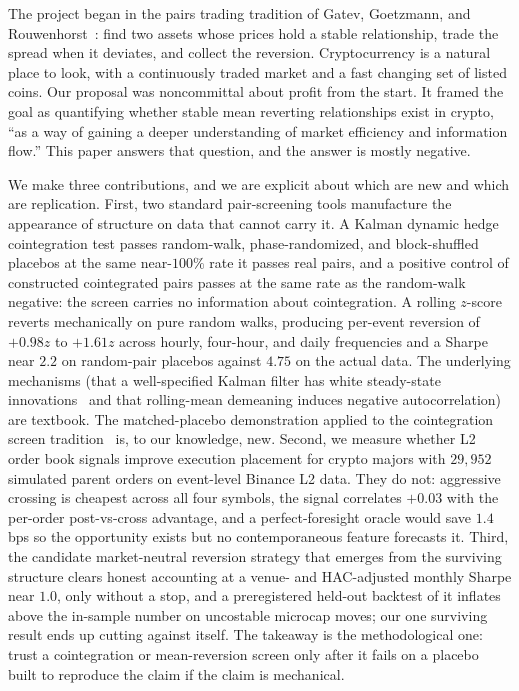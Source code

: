 \documentclass[11pt]{article}
\begin{document}
The project began in the pairs trading tradition of Gatev, Goetzmann, and
Rouwenhorst~\cite{gatev2006pairs}: find two assets whose prices hold a stable relationship, trade the
spread when it deviates, and collect the reversion. Cryptocurrency is a natural place to look,
with a continuously traded market and a fast changing set of listed coins. Our proposal was noncommittal about profit from the start. It framed the goal as quantifying whether stable mean reverting
relationships exist in crypto, ``as a way of gaining a deeper understanding of market efficiency
and information flow.'' This paper answers that question, and the answer is mostly negative.

We make three contributions, and we are explicit about which are new and which are
replication. First, two standard pair-screening tools manufacture the appearance of
structure on data that cannot carry it. A Kalman dynamic hedge cointegration test passes
random-walk, phase-randomized, and block-shuffled placebos at the same near-$100\%$ rate it
passes real pairs, and a positive control of constructed cointegrated pairs passes at the
same rate as the random-walk negative: the screen carries no information about
cointegration. A rolling $z$-score reverts mechanically on pure random walks, producing
per-event reversion of $+0.98z$ to $+1.61z$ across hourly, four-hour, and daily frequencies
and a Sharpe near $2.2$ on random-pair placebos against $4.75$ on the actual data. The
underlying mechanisms (that a well-specified Kalman filter has white steady-state
innovations~\cite{harvey1989structural} and that rolling-mean demeaning induces negative
autocorrelation) are textbook. The matched-placebo demonstration applied to the
cointegration screen tradition~\cite{vidyamurthy2004pairs, elliott2005pairs,
triantafyllopoulos2011dynamic} is, to our knowledge, new. Second, we measure whether L2
order book signals improve execution placement for crypto majors with $29{,}952$ simulated
parent orders on event-level Binance L2 data. They do not: aggressive crossing is cheapest
across all four symbols, the signal correlates $+0.03$ with the per-order post-vs-cross
advantage, and a perfect-foresight oracle would save $1.4$ bps so the opportunity exists
but no contemporaneous feature forecasts it. Third, the candidate market-neutral reversion
strategy that emerges from the surviving structure clears honest accounting at a venue- and
HAC-adjusted monthly Sharpe near $1.0$, only without a stop, and a preregistered held-out
backtest of it inflates above the in-sample number on uncostable microcap moves; our one
surviving result ends up cutting against itself. The takeaway is the methodological one:
trust a cointegration or mean-reversion screen only after it fails on a placebo built to
reproduce the claim if the claim is mechanical.
\end{document}
